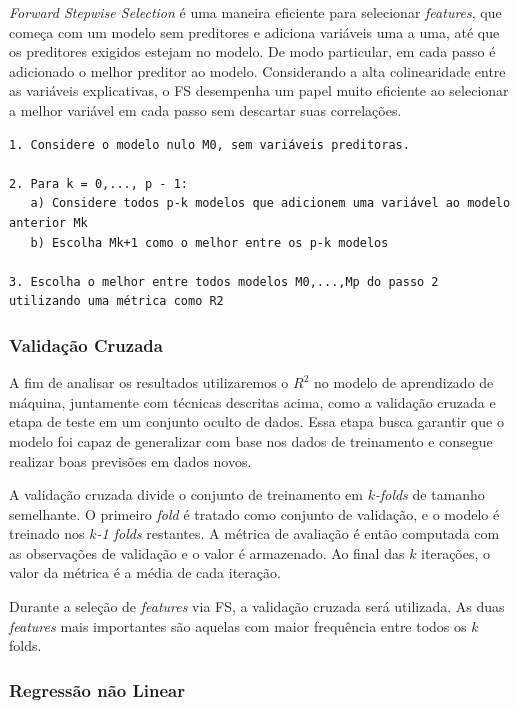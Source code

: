 \emph{Forward Stepwise Selection} é uma maneira eficiente para
selecionar \emph{features}, que começa com um modelo sem preditores e
adiciona variáveis uma a uma, até que os preditores exigidos estejam no
modelo. De modo particular, em cada passo é adicionado o melhor preditor
ao modelo. Considerando a alta colinearidade entre as variáveis
explicativas, o FS desempenha um papel muito eficiente ao selecionar a
melhor variável em cada passo sem descartar suas correlações.

\begin{verbatim}
1. Considere o modelo nulo M0, sem variáveis preditoras.

2. Para k = 0,..., p - 1:
   a) Considere todos p-k modelos que adicionem uma variável ao modelo anterior Mk
   b) Escolha Mk+1 como o melhor entre os p-k modelos 

3. Escolha o melhor entre todos modelos M0,...,Mp do passo 2 utilizando uma métrica como R2
\end{verbatim}

\subsubsection{Validação Cruzada}\label{validauxe7uxe3o-cruzada}

A fim de analisar os resultados utilizaremos o \(R^2\) no modelo de
aprendizado de máquina, juntamente com técnicas descritas acima, como a
validação cruzada e etapa de teste em um conjunto oculto de dados. Essa
etapa busca garantir que o modelo foi capaz de generalizar com base nos
dados de treinamento e consegue realizar boas previsões em dados novos.

A validação cruzada divide o conjunto de treinamento em
\emph{\(k\)-folds} de tamanho semelhante. O primeiro \emph{fold} é
tratado como conjunto de validação, e o modelo é treinado nos
\emph{\(k\)-1 folds} restantes. A métrica de avaliação é então computada
com as observações de validação e o valor é armazenado. Ao final das
\(k\) iterações, o valor da métrica é a média de cada iteração.

Durante a seleção de \emph{features} via FS, a validação cruzada será
utilizada. As duas \emph{features} mais importantes são aquelas com
maior frequência entre todos os \(k\) folds.

\subsubsection{Regressão não Linear}\label{regressuxe3o-nuxe3o-linear}

